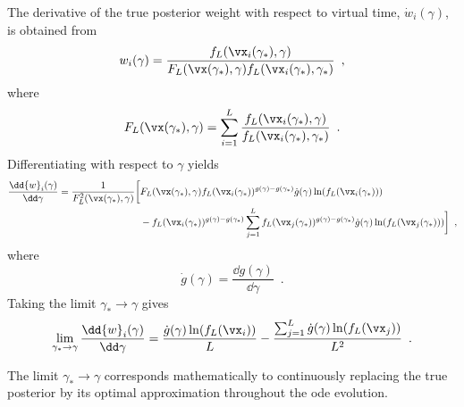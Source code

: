 The derivative of the true posterior weight with respect to virtual time, $\dot{w}_i(\gamma)$, is obtained from
\begin{equation}
	{w}_i(\gamma) = \frac{f_L(\vx_i(\gamma_*),\gamma)}{F_L(\vx(\gamma_*), \gamma)f_L(\vx_i(\gamma_*),\gamma_*)} \enspace,
\end{equation}
where
\begin{equation}
	F_L(\vx(\gamma_*), \gamma) = \sum_{i=1}^L \frac{f_L(\vx_i(\gamma_*),\gamma)}{f_L(\vx_i(\gamma_*),\gamma_*)} \enspace.
\end{equation}
Differentiating with respect to $\gamma$ yields
\begin{equation}
	\begin{split}
		\frac{\dd{w}_i(\gamma)}{\dd\gamma} = \frac{1}{F_L^2(\vx(\gamma_*), \gamma)} \bigg[ & F_L(\vx(\gamma_*), \gamma) f_L(\vx_i(\gamma_*))^{g(\gamma)-g(\gamma_*)} \dot{g}(\gamma) \ln(f_L(\vx_i(\gamma_*))) \\
		& - f_L(\vx_i(\gamma_*))^{g(\gamma)-g(\gamma_*)} \sum_{j=1}^L f_L(\vx_j(\gamma_*))^{g(\gamma)-g(\gamma_*)} \dot{g}(\gamma) \ln(f_L(\vx_j(\gamma_*))) \bigg] \enspace,
	\end{split}
\end{equation}
where
\begin{equation}
	\dot{g}(\gamma)=\frac{\dd g(\gamma)}{\dd \gamma} \enspace.
\end{equation}
Taking the limit $\gamma_* \to \gamma$ gives
\begin{equation}
	\lim_{\gamma_* \to \gamma} \frac{\dd{w}_i(\gamma)}{\dd\gamma} = \frac{\dot{g}(\gamma)\ln(f_L(\vx_i))}{L}-\frac{\sum_{j=1}^L \dot{g}(\gamma)\ln(f_L(\vx_j))}{L^2} \enspace.
\end{equation}

The limit $\gamma_* \to \gamma$ corresponds mathematically to continuously replacing the true posterior by its optimal approximation throughout the \ac{ode} evolution.

